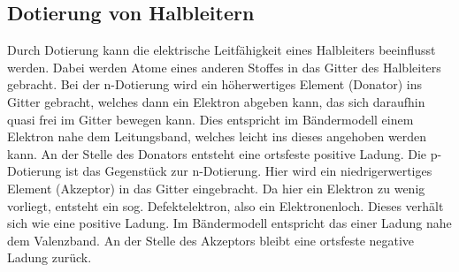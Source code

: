 \subsection{Dotierung von Halbleitern}
\label{subsec:dotierung}
Durch Dotierung kann die elektrische Leitfähigkeit eines Halbleiters beeinflusst werden.
Dabei werden Atome eines anderen Stoffes in das Gitter des Halbleiters gebracht.
Bei der n-Dotierung wird ein höherwertiges Element (Donator) ins Gitter gebracht, welches
dann ein Elektron abgeben kann, das sich daraufhin quasi frei im Gitter bewegen kann.
Dies entspricht im Bändermodell einem Elektron nahe dem Leitungsband, welches leicht
ins dieses angehoben werden kann. An der Stelle
des Donators entsteht eine ortsfeste positive Ladung.
Die p-Dotierung ist das Gegenstück zur n-Dotierung. Hier wird ein niedrigerwertiges
Element (Akzeptor) in das Gitter eingebracht. Da hier ein Elektron zu wenig vorliegt,
entsteht ein sog. Defektelektron, also ein Elektronenloch. Dieses verhält sich
wie eine positive Ladung. Im Bändermodell entspricht das einer Ladung
nahe dem Valenzband. An der Stelle
des Akzeptors bleibt eine ortsfeste negative Ladung zurück.

